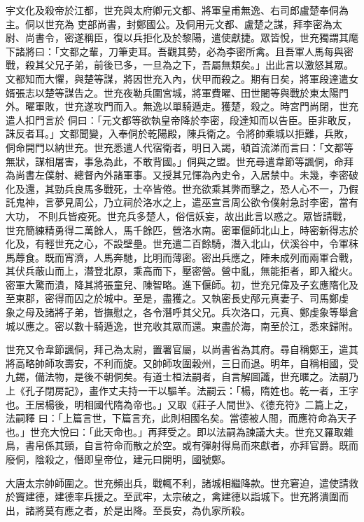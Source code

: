 \begin{pinyinscope}
 宇文化及殺帝於江都，世充與太府卿元文都、將軍皇甫無逸、右司郎盧楚奉侗為主。侗以世充為
 吏部尚書，封鄭國公。及侗用元文都、盧楚之謀，拜李密為太尉、尚書令，密遂稱臣，復以兵拒化及於黎陽，遣使獻捷。眾皆悅，世充獨謂其麾下諸將曰：「文都之輩，刀筆吏耳。吾觀其勢，必為李密所禽。且吾軍人馬每與密戰，殺其父兄子弟，前後已多，一旦為之下，吾屬無類矣。」出此言以激怒其眾。文都知而大懼，與楚等謀，將因世充入內，伏甲而殺之。期有日矣，將軍段達遣女婿張志以楚等謀告之。世充夜勒兵圍宮城，將軍費曜、田世闍等與戰於東太陽門外。曜軍敗，世充遂攻門而入。無逸以單騎遁走。獲楚，殺之。時宮門尚閉，世充遣人扣門言於
 侗曰：「元文都等欲執皇帝降於李密，段達知而以告臣。臣非敢反，誅反者耳。」文都聞變，入奉侗於乾陽殿，陳兵衛之。令將帥乘城以拒難，兵敗，侗命開門以納世充。世充悉遣人代宿衛者，明日入謁，頓首流涕而言曰：「文都等無狀，謀相屠害，事急為此，不敢背國。」侗與之盟。世充尋遣韋節等諷侗，命拜為尚書左僕射、總督內外諸軍事。又授其兄惲為內史令，入居禁中。未幾，李密破化及還，其勁兵良馬多戰死，士卒皆倦。世充欲乘其弊而擊之，恐人心不一，乃假託鬼神，言夢見周公，乃立祠於洛水之上，遣巫宣言周公欲令僕射急討李密，當有大功，
 不則兵皆疫死。世充兵多楚人，俗信妖妄，故出此言以惑之。眾皆請戰，世充簡練精勇得二萬餘人，馬千餘匹，營洛水南。密軍偃師北山上，時密新得志於化及，有輕世充之心，不設壁壘。世充遣二百餘騎，潛入北山，伏溪谷中，令軍秣馬蓐食。既而宵濟，人馬奔馳，比明而薄密。密出兵應之，陣未成列而兩軍合戰，其伏兵蔽山而上，潛登北原，乘高而下，壓密營。營中亂，無能拒者，即入縱火。密軍大驚而潰，降其將張童兒、陳智略。進下偃師。初，世充兄偉及子玄應隋化及至東郡，密得而囚之於城中。至是，盡獲之。又執密長史邴元真妻子、司馬鄭虔
 象之母及諸將子弟，皆撫慰之，各令潛呼其父兄。兵次洛口，元真、鄭虔象等舉倉城以應之。密以數十騎遁逸，世充收其眾而還。東盡於海，南至於江，悉來歸附。



 世充又令韋節諷侗，拜己為太尉，置署官屬，以尚書省為其府。尋自稱鄭王，遣其將高略帥師攻壽安，不利而旋。又帥師攻圍穀州，三日而退。明年，自稱相國，受九錫，備法物，是後不朝侗矣。有道士桓法嗣者，自言解圖讖，世充暱之。法嗣乃上《孔子閉房記》，畫作丈夫持一干以驅羊。法嗣云：「楊，隋姓也。乾一者，王字也。王居楊後，明相國代隋為帝也。」又取《莊子人間世》、《德充符》二篇上之，法嗣釋
 曰：「上篇言世，下篇言充，此則相國名矣。當德被人間，而應符命為天子也。」世充大悅曰：「此天命也。」再拜受之。即以法嗣為諫議大夫。世充又羅取雜鳥，書帛係其頸，自言符命而散之於空。或有彈射得鳥而來獻者，亦拜官爵。既而廢侗，陰殺之，僭即皇帝位，建元曰開明，國號鄭。



 大唐太宗帥師圍之。世充頻出兵，戰輒不利，諸城相繼降款。世充窘迫，遣使請救於竇建德，建德率兵援之。至武牢，太宗破之，禽建德以詣城下。世充將潰圍而出，諸將莫有應之者，於是出降。至長安，為仇家所殺。




\end{pinyinscope}
